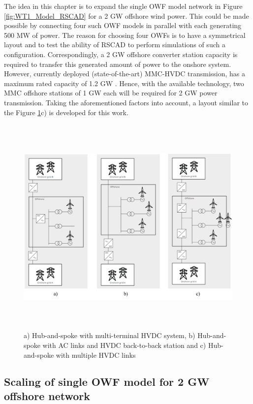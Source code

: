 The idea in this chapter is to expand the single \gls{OWF} model network in Figure \ref{fig:WT1_Model_RSCAD} for a 2 GW offshore wind power. This could be made possible by connecting four such \gls{OWF} models in parallel with each generating 500 MW of power. The reason for choosing four \gls{OWF}s is to have a symmetrical layout and to test the ability of RSCAD to perform simulations of such a configuration. Correspondingly, a 2 GW offshore converter station capacity is required to transfer this generated amount of power to the onshore system. However, currently deployed (state-of-the-art) \gls{MMC}-\gls{HVDC} transmission, has a maximum rated capacity of 1.2 GW \cite{cigre2005b4}. Hence, with the available technology, two \gls{MMC} offshore stations of 1 GW each will be required for 2 GW power transmission. Taking the aforementioned factors into account, a layout similar to the Figure \ref{fig:ABB_Hub_Spoke_3}c) is developed for this work. 

\begin{figure}[H]
\centering
    \includegraphics[height = 11cm,width = \textwidth]{Diagrams/Chapter_4/ABB_Hub_Spoke_3.png}
    \caption{a) Hub-and-spoke with multi-terminal HVDC system, b) Hub-and-spoke with AC links and HVDC back-to-back station and c) Hub-and-spoke with multiple HVDC links \cite{abb_hvdc_2018}}
    \label{fig:ABB_Hub_Spoke_3}
\end{figure}

\subsection{Scaling of single \gls{OWF} model for 2 GW offshore network}\label{scaling_2GW}

